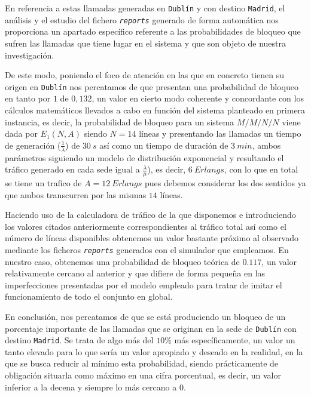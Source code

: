 \documentclass{article}[10pt]
\begin{document}
		En referencia a estas llamadas generadas en \texttt{Dublín} y con destino \texttt{Madrid}, el análisis y el estudio del fichero \texttt{\textit{reports}} generado de forma automática nos proporciona un apartado específico referente a las probabilidades de bloqueo que sufren las llamadas que tiene lugar en el sistema y que son objeto de nuestra investigación.

		De este modo, poniendo el foco de atención en las que en concreto tienen su origen en \texttt{Dublín} nos percatamos de que presentan una probabilidad de bloqueo en tanto por $1$ de $0,132$, un valor en cierto modo coherente y concordante con los cálculos matemáticos llevados a cabo en función del sistema planteado en primera instancia, es decir, la probabilidad de bloqueo para un sistema $M/M/N/N$ viene dada por $E_1(N, A)$ siendo $N = 14$ líneas y presentando las llamadas un tiempo de generación ($\frac{1}{\lambda}$) de $30\ s$ así como un tiempo de duración de $3\ min$, ambos parámetros siguiendo un modelo de distribución exponencial y resultando el tráfico generado en cada sede igual a $\frac{\lambda}{\mu}$), es decir, $6\ Erlangs$, con lo que en total se tiene un trafico de $A = 12\ Erlangs$ pues debemos considerar los dos sentidos ya que ambos transcurren por las mismas $14$ líneas.

		Haciendo uso de la calculadora de tráfico de la que disponemos e introduciendo los valores citados anteriormente correspondientes al tráfico total así como el número de líneas disponibles obtenemos un valor bastante próximo al observado mediante los ficheros \texttt{\textit{reports}} generados con el simulador que empleamos. En nuestro caso, obtenemos una probabilidad de bloqueo teórica de $0.117$, un valor relativamente cercano al anterior y que difiere de forma pequeña en las imperfecciones presentadas por el modelo empleado para tratar de imitar el funcionamiento de todo el conjunto en global.

		En conclusión, nos percatamos de que se está produciendo un bloqueo de un porcentaje importante de las llamadas que se originan en la sede de \texttt{Dublín} con destino \texttt{Madrid}. Se trata de algo más del $10\%$ más específicamente, un valor un tanto elevado para lo que sería un valor apropiado y deseado en la realidad, en la que se busca reducir al mínimo esta probabilidad, siendo prácticamente de obligación situarla como máximo en una cifra porcentual, es decir, un valor inferior a la decena y siempre lo más cercano a $0$.
\end{document}
